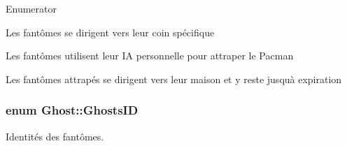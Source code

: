 \begin{Desc}
\item[Enumerator]\par
\begin{description}
\item[{\em 
\hypertarget{class_ghost_a95bc4313fdf87d827c64fe9607fcc205a49e7cffc44104e0f3f65579a25804b63}{}Scatter\label{class_ghost_a95bc4313fdf87d827c64fe9607fcc205a49e7cffc44104e0f3f65579a25804b63}
}]Les fantômes se dirigent vers leur coin spécifique \item[{\em 
\hypertarget{class_ghost_a95bc4313fdf87d827c64fe9607fcc205a4e0f748a4d226742a8d524f8386fc6db}{}Chase\label{class_ghost_a95bc4313fdf87d827c64fe9607fcc205a4e0f748a4d226742a8d524f8386fc6db}
}]Les fantômes utilisent leur I\+A personnelle pour attraper le Pacman \item[{\em 
\hypertarget{class_ghost_a95bc4313fdf87d827c64fe9607fcc205ae7975f0b636e971a50a0a4285353ac0e}{}Caught\label{class_ghost_a95bc4313fdf87d827c64fe9607fcc205ae7975f0b636e971a50a0a4285353ac0e}
}]Les fantômes attrapés se dirigent vers leur maison et y reste jusqu\textquotesingle{}à expiration \end{description}
\end{Desc}
\hypertarget{class_ghost_adc8bee2d77e1ca0e4999cace773c71dd}{}
\subsubsection[{Ghosts\+I\+D}]{\setlength{\rightskip}{0pt plus 5cm}enum {\bf Ghost\+::\+Ghosts\+I\+D}}\label{class_ghost_adc8bee2d77e1ca0e4999cace773c71dd}


Identités des fantômes. 

